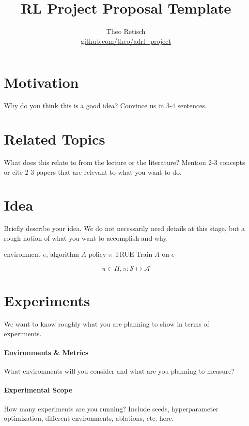 \documentclass{article}
\title{RL Project Proposal Template}
\author{Theo Retisch \\ \url{github.com/theo/adrl_project}}
\begin{document}
\maketitle
\section{Motivation}
Why do you think this is a good idea? Convince us in 3-4 sentences.

\section{Related Topics}
What does this relate to from the lecture or the literature? Mention 2-3 concepts or cite 2-3 papers that are relevant to what you want to do.

\section{Idea}
Briefly describe your idea. We do not necessarily need details at this stage, but a rough notion of what you want to accomplish and why.

\begin{algorithm}[H]
    \caption{A great RL algorithm.}
    \label{alg:code}
    \begin{algorithmic}
        \Require environment $e$, algorithm $A$
        \Return policy $\pi$
        \While TRUE
            \State Train $A$ on $e$
        \EndWhile
    \end{algorithmic}
\end{algorithm}

\begin{equation}
    \label{eq:pi}
    \pi \in \Pi, \pi: \mathcal{S} \mapsto \mathcal{A}
\end{equation}

\section{Experiments}
We want to know roughly what you are planning to show in terms of experiments. 

\paragraph{Environments \& Metrics} What environments will you consider and what are you planning to measure? 

\paragraph{Experimental Scope} How many experiments are you running? Include seeds, hyperparameter optimization, different environments, ablations, etc. here.
\end{document}
